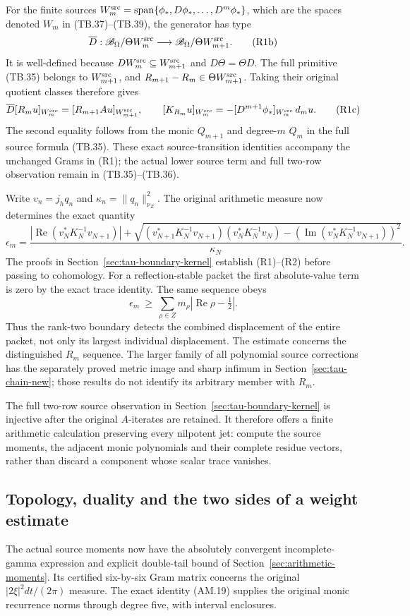 For the finite sources
$W_m^{\rm src}=\operatorname{span}\{\phi_*,D\phi_*,\ldots,D^m\phi_*\}$,
which are the spaces denoted $W_m$ in (TB.37)--(TB.39), the
generator has type
\[
\overline D:
 \mathscr B_\Omega/\Theta W_m^{\rm src}\longrightarrow
 \mathscr B_\Omega/\Theta W_{m+1}^{\rm src}.
\tag{R1b}
\]
It is well-defined because $DW_m^{\rm src}\subseteq W_{m+1}^{\rm src}$
and $D\Theta=\Theta D$.  The full primitive (TB.35) belongs to
$W_{m+1}^{\rm src}$, and $R_{m+1}-R_m\in\Theta W_{m+1}^{\rm src}$.
Taking their original quotient classes therefore gives
\[
 \overline D[R_mu]_{W_m^{\rm src}}
       =[R_{m+1}Au]_{W_{m+1}^{\rm src}},\qquad
 [K_{R_m}u]_{W_m^{\rm src}}
       =-[D^{m+1}\phi_*]_{W_m^{\rm src}}\,d_mu.
\tag{R1c}
\]
The second equality follows from the monic $Q_{m+1}$ and
degree-$m$ $Q_m$ in the full source formula (TB.35).
These exact source-transition identities accompany the unchanged
Grams in (R1); the actual lower source term and full two-row
observation remain in (TB.35)--(TB.36).


Write \(v_n=j_hq_n\) and \(\kappa_n=\|q_n\|_{\nu_Z}^2\).
The original arithmetic measure now determines the exact quantity
\[
 \epsilon_m=
 \frac{|\operatorname{Re}(v_N^*K_N^{-1}v_{N+1})|
 +\sqrt{(v_{N+1}^*K_N^{-1}v_{N+1})(v_N^*K_N^{-1}v_N)
       -(\operatorname{Im}(v_N^*K_N^{-1}v_{N+1}))^2}}
      {\kappa_N}.
 \tag{R2}
\]
The proofs in Section~\ref{sec:tau-boundary-kernel} establish
(R1)--(R2) before passing to cohomology.
For a reflection-stable packet the first absolute-value term is
zero by the exact trace identity. The same sequence obeys
\[
 \epsilon_m\ \geq\
       \sum_{\rho\in Z}m_\rho
                   |\operatorname{Re}\rho-\tfrac12|.
 \tag{R3}
\]
Thus the rank-two boundary detects the combined displacement of
the entire packet, not only its largest individual displacement.
The estimate concerns the distinguished \(R_m\) sequence.
The larger family of all polynomial source corrections has the
separately proved metric image and sharp infimum in
Section~\ref{sec:tau-chain-new}; those results do not identify
its arbitrary member with \(R_m\).

The full two-row source observation in
Section~\ref{sec:tau-boundary-kernel} is injective after the
original \(A\)-iterates are retained. It therefore offers a
finite arithmetic calculation preserving every nilpotent jet:
compute the source moments, the adjacent monic polynomials and
their complete residue vectors, rather than discard a component
whose scalar trace vanishes.

\subsection{Topology, duality and the two sides of a weight estimate}
The actual source moments now have the absolutely convergent
incomplete-gamma expression and explicit double-tail bound of
Section~\ref{sec:arithmetic-moments}. Its certified six-by-six
Gram matrix concerns the original \(|2\xi|^2dt/(2\pi)\) measure.
The exact identity (AM.19) supplies the original monic recurrence
norms through degree five, with interval enclosures.


